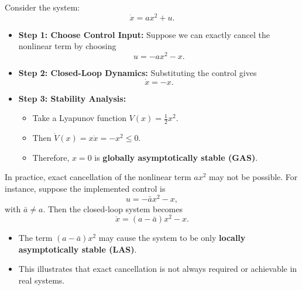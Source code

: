 \begin{example}
Consider the system:
\begin{equation}
\dot{x} = a x^2 + u.
\end{equation}

\begin{itemize}
    \item \textbf{Step 1: Choose Control Input:}  
    Suppose we can exactly cancel the nonlinear term by choosing
    \begin{equation}
    u = - a x^2 - x.
    \end{equation}

    \item \textbf{Step 2: Closed-Loop Dynamics:}  
    Substituting the control gives
    \begin{equation}
    \dot{x} = -x.
    \end{equation}

    \item \textbf{Step 3: Stability Analysis:}  
    \begin{itemize}
        \item Take a Lyapunov function \(V(x) = \frac{1}{2} x^2\).  
        \item Then \(\dot{V}(x) = x \dot{x} = - x^2 \le 0\).  
        \item Therefore, \(x=0\) is \textbf{globally asymptotically stable (GAS)}.
    \end{itemize}
\end{itemize}
\end{example}

\begin{remark}
In practice, exact cancellation of the nonlinear term \(a x^2\) may not be possible. For instance, suppose the implemented control is
\begin{equation}
u = - \bar{a} x^2 - x,
\end{equation}
with \(\bar{a} \neq a\). Then the closed-loop system becomes
\begin{equation}
\dot{x} = (a - \bar{a}) x^2 - x.
\end{equation}

\begin{itemize}
    \item The term \((a-\bar{a}) x^2\) may cause the system to be only \textbf{locally asymptotically stable (LAS)}.  
    \item This illustrates that exact cancellation is not always required or achievable in real systems.
\end{itemize}
\end{remark}

